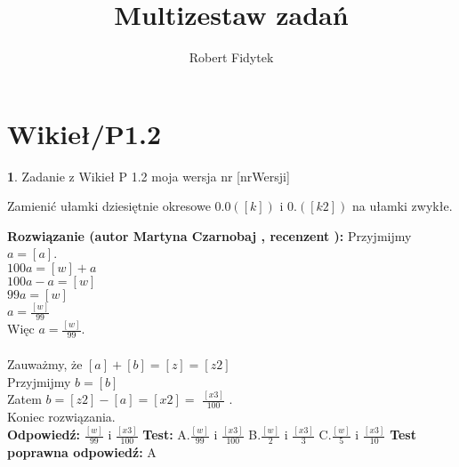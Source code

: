 \documentclass[12pt, a4paper]{article}
\title{Multizestaw zadań}
\author{Robert Fidytek}
\date{}
\theoremstyle{definition} %
\newtheorem{zad}{}
\newcommand{\kategoria}[1]{\section{#1}} %
\newcommand{\zadStart}[1]{\begin{zad}#1\newline} %
\newcommand{\zadStop}{\end{zad}}   %
\newcommand{\rozwStart}[2]{\noindent \textbf{Rozwiązanie (autor #1 , recenzent #2): }\newline} %
\newcommand{\rozwStop}{\newline}                                            %
\newcommand{\odpStart}{\noindent \textbf{Odpowiedź:}\newline}    %
\newcommand{\odpStop}{\newline}                                             %
\newcommand{\testStart}{\noindent \textbf{Test:}\newline} %
\newcommand{\testStop}{\newline} %
\newcommand{\kluczStart}{\noindent \textbf{Test poprawna odpowiedź:}\newline} %
\newcommand{\kluczStop}{\newline} %
\begin{document}
\maketitle


\kategoria{Wikieł/P1.2}
\zadStart{Zadanie z Wikieł P 1.2 moja wersja nr [nrWersji]}

Zamienić ułamki dziesiętnie okresowe $0.0([k])$ i $0.([k2])$ na ułamki zwykłe.
\zadStop
\rozwStart{Martyna Czarnobaj}{}
Przyjmijmy $a = [a]$.\\
$ 100a = [w]+ a $\\
$ 100a - a = [w] $\\
$ 99a = [w] $\\
$ a = \frac{[w]}{99} $\\
Więc $ a = \frac{[w]}{99} $.\\
\\
Zauważmy, że $ [a] + [b] = [z]  = [z2] $\\
Przyjmijmy $ b = [b] $\\
Zatem $ b = [z2] - [a] =[x2]= $ $\frac{[x3]}{100} $ .\\
Koniec rozwiązania.\\
\rozwStop
\odpStart
$  \frac{[w]}{99} $ i $ \frac{[x3]}{100} $
\odpStop
\testStart
A.$\frac{[w]}{99} $ i $ \frac{[x3]}{100} $
B.$\frac{[w]}{2} $ i $ \frac{[x3]}{3} $
C.$\frac{[w]}{5} $ i $ \frac{[x3]}{10} $
\testStop
\kluczStart
A
\kluczStop
\end{document}
